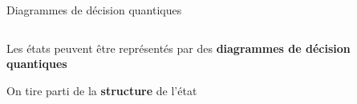 \begin{frame}{Diagrammes de décision quantiques}
    \begin{columns}
        \begin{column}{0.7\textwidth}
            Les états peuvent être représentés par des \textbf{diagrammes de décision quantiques}

            \vspace{1em}

            On tire parti de la \textbf{structure} de l'état
        \end{column}
        \begin{column}{0.3\textwidth}
        \end{column}
    \end{columns}
\end{frame}

